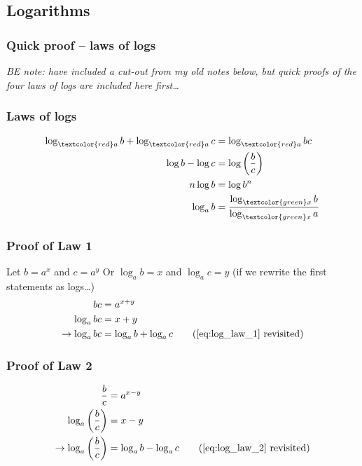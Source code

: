 \subsection{Logarithms}

\subsubsection{Quick proof {--} laws of logs}

\textit{%
	BE note: have included a cut-out from my old notes below,
	but quick proofs of the four laws of logs are included here first\dots
}
\subsubsection*{Laws of logs}
\begin{align}
	\log_{\textcolor{red}a}{b} + \log_{\textcolor{red}a}{c} 
		&= \log_{\textcolor{red}a}{bc} 
		\label{eq:log_law_1}
		\\
	\log{b} - \log{c} 
		&= \log{\left( \frac{b}{c} \right)} 
		\label{eq:log_law_2}
		\\
	n \log{b}
		&= \log{b^{n}} 
		\label{eq:log_law_3}
		\\
	\log_{a}{b}
		&= \frac{\log_{\textcolor{green}x}{b}}{\log_{\textcolor{green}x}{a}}
		\label{eq:log_law_4}
\end{align}
\subsubsection*{Proof of Law 1}
Let $b=a^{x}$ and $c=a^{y}$
\newline
Or $\log_{a}{b} = x$ and $\log_{a}{c} = y$
(if we rewrite the first statements as logs\dots)
\begin{align*}
	bc 
		&= a^{x+y}
		\\
	\log_{a}{bc} 
		&= x + y
		\\
	\rightarrow
	\log_{a}{bc} 
		&= \log_{a}{b} + \log_{a}{c}
		\tag{\ref{eq:log_law_1} revisited}
\end{align*}
\subsubsection*{Proof of Law 2}
\begin{align*}
	\frac{b}{c} 
		&= a^{x-y}
		\\
	\log_{a}{\left( \frac{b}{c} \right)} 
		&= x - y
		\\
	\rightarrow
	\log_{a}{\left( \frac{b}{c} \right)}
		&= \log_{a}{b} - \log_{a}{c}
		\tag{\ref{eq:log_law_2} revisited}
\end{align*}
